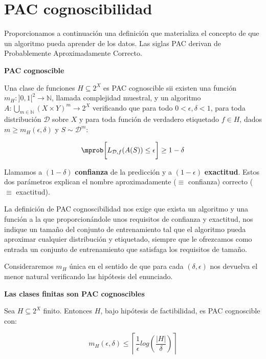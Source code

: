 \section{PAC cognoscibilidad}
Proporcionamos a continuación una definición que materializa el concepto de que un algoritmo pueda aprender de los datos. Las
siglas PAC derivan de Probablemente Aproximadamente Correcto.

\begin{definition*} \textbf{PAC cognoscible}

Una clase de funciones $H \subseteq 2^X$ es PAC cognoscible sii existen una función 
$m_{H} : ]0,1[^2\rightarrow \mathbb{N}$, llamada complejidad muestral, y un algoritmo 
$A: \underset{m\in \mathbb{N}}{\bigcup} (X\times Y)^m \rightarrow 2^X$ verificando que para todo
$0 < \epsilon, \delta < 1$, para toda distribución $\mathcal{D}$ sobre $X$ y para toda función de 
verdadero etiquetado $f\in H$, dados $m \ge m_H(\epsilon, \delta)$ y $S\sim \mathcal{D}^m$:

\[\mprob \bigg[L_{\mathcal{D},f}(A(S)) \le \epsilon \bigg] \ge 1-\delta\]
\end{definition*}

Llamamos a $(1-\delta)$ \textbf{confianza} de la predicción y a $(1-\epsilon)$ \textbf{exactitud}. Estos dos parámetros 
explican el nombre aproximadamente ($\equiv$ confianza) correcto ($\equiv$ exactitud).

La definición de PAC cognoscibilidad nos exige que exista un algoritmo y una función a la que proporcionándole unos requisitos
de confianza y exactitud, nos indique un tamaño del conjunto de entrenamiento tal que el algoritmo pueda aproximar cualquier
distribución y etiquetado, siempre que le ofrezcamos como entrada un conjunto de entrenamiento que satisfaga los 
requisitos de tamaño.

Consideraremos $m_{H}$ única en el sentido de que para cada $(\delta, \epsilon)$ nos devuelva el menor natural
verificando las hipótesis del enunciado.

\begin{theorem*} \textbf{Las clases finitas son PAC cognoscibles}

Sea $H \subseteq 2^{X}$ finito. Entonces $H$, bajo hipótesis de factibilidad, es PAC cognoscible con:

\[m_H(\epsilon, \delta) \le \left\lceil \frac{1}{\epsilon}log \left(\frac{|H|}{\delta} \right) \right\rceil\]
\end{theorem*}

